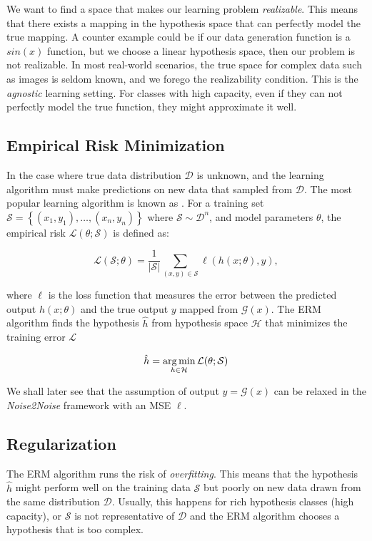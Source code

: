 We want to find a space that makes our learning problem \textit{realizable}. This means that there exists a mapping in the hypothesis space that can perfectly model the true mapping. A counter example could be if our data generation function is a $sin(x)$ function, but we choose a linear hypothesis space, then our problem is not realizable. In most real-world scenarios, the true space for complex data such as images is seldom known, and we forego the realizability condition. This is the \textit{agnostic} learning setting. For classes with high capacity, even if they can not perfectly model the true function, they might approximate it well.

\subsection{Empirical Risk Minimization}

In the case where true data distribution $\mathcal{D}$ is unknown, and the learning algorithm must make predictions on new data that sampled from $\mathcal{D}$.
The most popular learning algorithm is known as \textit{}. For a training set $\mathcal{S} = \left\{ (x_1, y_1), \ldots, (x_n, y_n) \right\}$ where $\mathcal{S} \sim \mathcal{D}^n$, and model parameters $\theta$, the empirical risk $\mathcal{L}(\theta; \mathcal{S})$ is defined as:

\begin{equation}
    \mathcal{L}(\mathcal{S}; \theta) = \frac{1}{\lvert \mathcal{S} \rvert} \sum_{(x, y) \in \mathcal{S}} \ell(h(x; \theta), y),
\end{equation}

where $\ell$ is the loss function that measures the error between the predicted output $h(x; \theta)$ and the true output $y$ mapped from $\mathcal{G} (x)$. The \gls{ERM} algorithm finds the hypothesis $\hat{h}$ from hypothesis space $\mathcal{H}$ that minimizes the training error $\mathcal{L}$

\begin{equation}
    \hat{h} = \operatorname*{arg\,min}_{h \in \mathcal{H}} \mathcal{L}(\theta; \mathcal{S})
\end{equation}

We shall later see that the assumption of output  $y = \mathcal{G} (x)$ can be relaxed in the \textit{Noise2Noise} framework with an \gls{MSE} $\ell$.

\subsection{Regularization}
The \gls{ERM} algorithm runs the risk of \textit{overfitting}. This means that the hypothesis $\hat{h}$ might perform well on the training data $\mathcal{S}$ but poorly on new data drawn from the same distribution $\mathcal{D}$. Usually, this happens for rich hypothesis classes (high capacity), or $\mathcal{S}$ is not representative of $\mathcal{D}$ and the \gls{ERM} algorithm chooses a hypothesis that is too complex. 

